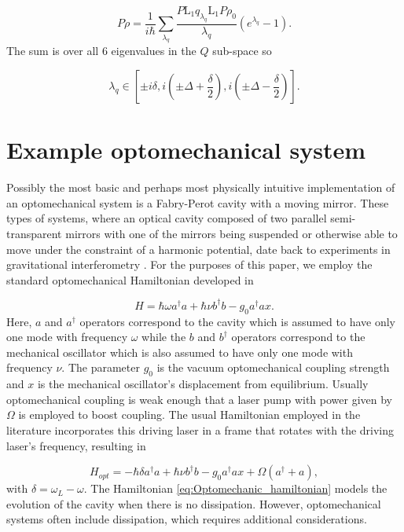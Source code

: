 \documentclass[12pt]{article}
\begin{document}
\begin{equation}
    P\dot{\rho} = \frac{1}{i\hbar}\sum_{\lambda_q} \frac{P \mathrm{L}_1  q_{\lambda_q}\mathrm{L}_1P\rho_0}{\lambda_q} (e^{\lambda_q} -1).
\end{equation} The sum is over all 6 eigenvalues in the $Q$ sub-space so

\begin{equation}
    \lambda_q \in [\pm i\delta, i(\pm\Delta+\frac{\delta}{2}), i(\pm\Delta - \frac{\delta}{2} )].
\end{equation}



\section{Example optomechanical system}\label{sec:ExampleSystem}

Possibly the most basic and perhaps most physically intuitive implementation of an optomechanical system is a Fabry-Perot cavity with a moving mirror. These types of systems, where an optical cavity composed of two parallel semi-transparent mirrors with one of the mirrors being suspended or otherwise able to move under the constraint of a harmonic potential, date back to experiments in gravitational interferometry \cite{AbramoviciLIGO1992}. For the purposes of this paper, we employ the standard optomechanical Hamiltonian developed in \cite{LawMovingMirror1995}

\begin{equation}\label{eq:basic_hamiltonian}
    H=\hbar \omega a^\dagger a + \hbar\nu b^\dagger b - g_0 a^\dagger a x.
\end{equation} Here, $a$ and $a^\dagger$ operators correspond to the cavity which is assumed to have only one mode with frequency $\omega$ while the $b$ and $b^\dagger$ operators correspond to the mechanical oscillator which is also assumed to have only one mode with frequency $\nu$. The parameter $g_0$ is the vacuum optomechanical coupling strength and $x$ is the mechanical oscillator's displacement from equilibrium.  Usually optomechanical coupling is weak enough that a laser pump with power given by $\Omega$ is employed to boost coupling. The usual Hamiltonian employed in the literature incorporates this driving laser in a frame that rotates with the driving laser's frequency, resulting in

\begin{equation}\label{eq:Optomechanic_hamiltonian}
    H_{opt}=-\hbar \delta a^\dagger a + \hbar\nu b^\dagger b - g_0 a^\dagger a x + \Omega(a^\dagger+a),
\end{equation} with $\delta = \omega_L-\omega$. The Hamiltonian \eqref{eq:Optomechanic_hamiltonian} models the evolution of the cavity when there is no dissipation. However, optomechanical systems often include dissipation, which requires additional considerations.
\end{document}
